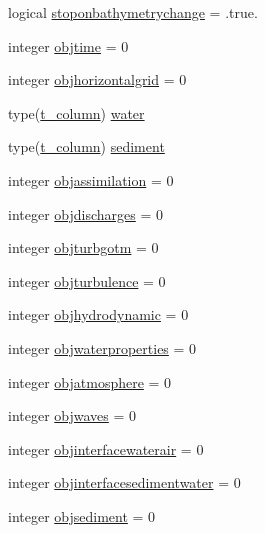 \begin{DoxyCompactItemize}
\item 
logical \mbox{\hyperlink{structmodulemodel_1_1t__model_a7c9b5aae261e34e308ac22a2386ba979}{stoponbathymetrychange}} = .true.
\item 
integer \mbox{\hyperlink{structmodulemodel_1_1t__model_a6632233770ba32536cb20e906df294c8}{objtime}} = 0
\item 
integer \mbox{\hyperlink{structmodulemodel_1_1t__model_ad3943d002ddee34f98d1965c13fbf628}{objhorizontalgrid}} = 0
\item 
type(\mbox{\hyperlink{structmodulemodel_1_1t__column}{t\+\_\+column}}) \mbox{\hyperlink{structmodulemodel_1_1t__model_a59d87987e7ffbeb5b46799cb162e0e80}{water}}
\item 
type(\mbox{\hyperlink{structmodulemodel_1_1t__column}{t\+\_\+column}}) \mbox{\hyperlink{structmodulemodel_1_1t__model_a13aca7ba3f2863f1a945c58c151260fd}{sediment}}
\item 
integer \mbox{\hyperlink{structmodulemodel_1_1t__model_aded43097bf950365c70c660cc72f518d}{objassimilation}} = 0
\item 
integer \mbox{\hyperlink{structmodulemodel_1_1t__model_a6328f91577aca2cf015e71cd07b33c81}{objdischarges}} = 0
\item 
integer \mbox{\hyperlink{structmodulemodel_1_1t__model_a355ca10d7790e5ecb6f5e38a1af77ad0}{objturbgotm}} = 0
\item 
integer \mbox{\hyperlink{structmodulemodel_1_1t__model_accd00655f7089c1c45388781155e7d1a}{objturbulence}} = 0
\item 
integer \mbox{\hyperlink{structmodulemodel_1_1t__model_a83f972012c1d04a2aca9dda3eccfefc3}{objhydrodynamic}} = 0
\item 
integer \mbox{\hyperlink{structmodulemodel_1_1t__model_acafb0b382a6a07b2adcf801329ffb039}{objwaterproperties}} = 0
\item 
integer \mbox{\hyperlink{structmodulemodel_1_1t__model_a5eb04ed7cc062e2801de782128f91162}{objatmosphere}} = 0
\item 
integer \mbox{\hyperlink{structmodulemodel_1_1t__model_afb34f54fc6d2d6589a061c302702f9b5}{objwaves}} = 0
\item 
integer \mbox{\hyperlink{structmodulemodel_1_1t__model_a1b8709231189d6bda738513f26327a56}{objinterfacewaterair}} = 0
\item 
integer \mbox{\hyperlink{structmodulemodel_1_1t__model_a78d2967b5446ad1eec269ab5a11e8af6}{objinterfacesedimentwater}} = 0
\item 
integer \mbox{\hyperlink{structmodulemodel_1_1t__model_aae8c978d928530d81fea5b1b9927cb60}{objsediment}} = 0

\end{DoxyCompactItemize}

